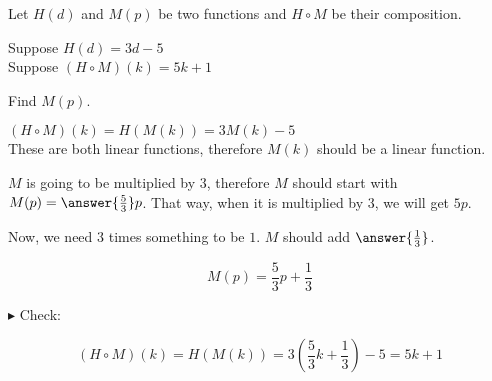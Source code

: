 \documentclass{ximera}
\begin{document}
\begin{example}


Let $H(d)$ and $M(p)$ be two functions and $H \circ M$ be their composition.


Suppose $H(d) = 3 d - 5$ \\

Suppose $(H \circ M)(k) = 5 k + 1$


Find $M(p)$.



\begin{explanation}




$(H \circ M)(k) = H(M(k)) = 3 M(k) - 5 $  \\




These are both linear functions, therefore $M(k)$ should be a linear function.


$M$ is going to be multiplied by $3$, therefore $M$ should start with $M(p) = \answer{\frac{5}{3}}p$. That way, when it is multiplied by $3$, we will get $5p$.




Now, we need $3$ times something to be $1$.  $M$ should add $\answer{\frac{1}{3}}$.

\[  M(p) =    \frac{5}{3} p +     \frac{1}{3} \]



$\blacktriangleright$ Check: 


\[    (H \circ M)(k) = H(M(k)) = 3 \left( \frac{5}{3} k + \frac{1}{3} \right) - 5 =    5 k + 1    \]




\end{explanation} 

\end{example}
\end{document}
